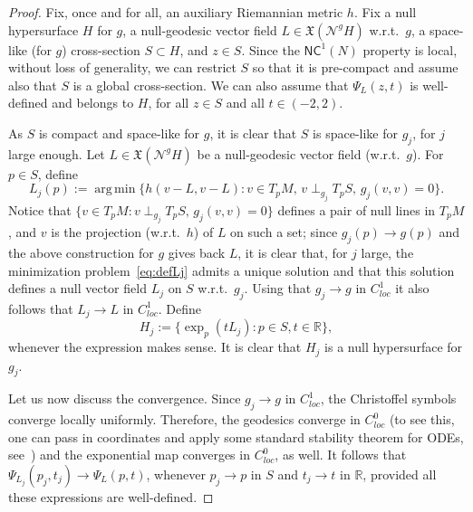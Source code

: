 \documentclass[12pt,a4paper]{amsart}
\theoremstyle{plain}
\theoremstyle{definition}
\numberwithin{equation}{section}
\newcommand{\R}{\mathbb{R}}
\DeclareMathOperator*{\argmin}{arg\,min}
\newcommand{\NC}{\mathsf{NC}}
\newcommand{\gflow}{\Psi}
\newcommand{\vfield}{\mathfrak{X}}
\newcommand{\normal}{\mathscr{N}}
\begin{document}
\begin{proof}
  Fix, once and for all, an auxiliary Riemannian metric $h$.
  Fix a null hypersurface $H$ for $g$,  a
  null-geodesic vector field $L\in\vfield(\normal^gH)$ w.r.t.\ $g$,  a space-like (for $g$)
  cross-section $S\subset H$, and $z\in S$.
  Since the $\NC^1(N)$ property is local, without loss of generality, we can restrict $S$ so that it is pre-compact and
  assume also that $S$ is a global cross-section.
  We can also assume that $\gflow_L(z,t)$ is well-defined and belongs to
  $H$, for all $z\in S$ and all $t\in(-2,2)$.

  As $S$ is compact and space-like for $g$, it is clear that $S$ is
  space-like for $g_j$, for $j$ large enough.
  Let $L\in\vfield(\normal^g H)$ be a null-geodesic vector field
  (w.r.t.\ $g$).
  For $p\in S$, define
  \begin{equation}\label{eq:defLj}
    L_j(p)
    :=
    \argmin
    \{
    h(v-L,v-L): v\in T_pM,\,
    v\perp_{g_j} T_p S,\, g_j(v,v)=0
    \}
    .
  \end{equation}
  Notice that $\{v\in T_pM:
    v\perp_{g_j} T_p S,\, g_j(v,v)=0  \}$ defines a pair of null lines in $T_pM$, and $v$ is the projection (w.r.t.\ $h$) of $L$ on such a set; since $g_j(p)\to g(p)$ and the above construction for $g$ gives back $L$, it is clear that, for $j$ large, the minimization problem~\eqref{eq:defLj} admits a
  unique solution and that this solution defines a null vector field
  $L_j$ on $S$ w.r.t.\ $g_j$. Using that $g_j\to g$ in $C^1_{loc}$ it also follows that $L_j\to L$ in $C^1_{loc}$.
  Define
  \begin{equation}
    H_j
    :=
    \{
    \exp_p(tL_j): p\in S, t\in \R
    \}
    ,
  \end{equation}
  whenever the expression makes sense.
  It is clear that $H_j$ is a null hypersurface for $g_j$.

  Let us now discuss the convergence.
  Since $g_j\to g$ in $C^1_{loc}$,   the Christoffel symbols converge locally uniformly. 
  Therefore, the geodesics converge in $C^0_{loc}$ (to see
  this, one can pass in coordinates and apply some standard
  stability theorem for ODEs, see~\cite[Lemma~3.1,~p.~24]{Hale80}) and
  the exponential map converges in $C^0_{loc}$, as well.
  It follows that $\gflow_{L_j}(p_j,t_j)\to
  \gflow_L(p,t)$, whenever $p_j\to p$ in $S$ and $t_j\to t$ in $\R$, provided
  all these expressions are well-defined.
  

\end{proof}
\end{document}
